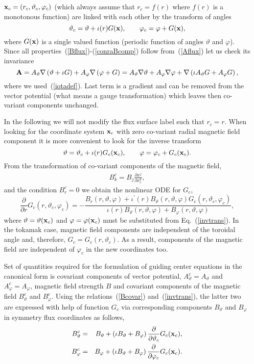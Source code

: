\documentclass[12pt]{article}
\newcommand{\be}[1]{\begin{equation} \label{#1}}
\newcommand{\ee}{\end{equation}}
\newcommand{\bea}[1]{\begin{eqnarray} \label{#1}}
\newcommand{\eea}{\end{eqnarray}}
\newcommand{\eq}[1]{(\ref{#1})}
\newcommand{\difp}[2]{\frac{\partial #1}{\partial #2}}
\newcommand{\bA}{{\bf A}}
\newcommand{\bx}{{\bf x}}
\begin{document}
\begin{itemize}
$\bx_c=(r_c,\vartheta_c,\varphi_c)$ (which always assume 
that $r_c=f(r)$ where $f(r)$ is a monotonous function) 
are linked with each other by the transform of angles
\be{transangles}
\vartheta_c = \vartheta+\iota(r)G(\bx),
\qquad
\varphi_c = \varphi+G(\bx),
\ee
where $G(\bx)$ is a single valued function 
(periodic function of angles $\vartheta$ and $\varphi$).
Since all properties~\eq{Bflux}-\eq{conraBcomp} follow from~\eq{Aflux}
let us check its invariance
\be{Acheck}
\bA=
A_\vartheta\nabla\left(\vartheta+\iota G\right)
+
A_\varphi\nabla\left(\varphi+ G\right)
=
A_\vartheta\nabla\vartheta+A_\varphi\nabla\varphi
+\nabla\left(\iota A_\vartheta G+A_\varphi G\right),
\ee
where we used~\eq{iotadef}. Last term is a gradient and can be removed from
the vector potential (what means a gauge transformation) which leaves then co-variant components unchanged.
\end{itemize}
In the following we will not modify the flux surface label such that $r_c=r$.
When looking for the coordinate system $\bx_c$ with zero co-variant radial magnetic 
field component it is more convenient to look for the inverse
transform
\be{invtrans}
\vartheta = \vartheta_c+\iota(r)G_c(\bx_c),
\qquad
\varphi = \varphi_c+G_c(\bx_c).
\ee
From the transformation of co-variant components of the magnetic field,
\bea{Bcovar}
B_k^c=B_j\difp{x^j}{x_c^k},
\eea
and the condition $B^c_r=0$ we obtain the nonlinear ODE for $G_c$,
\be{eqforG}
\difp{}{r}G_c(r,\vartheta_c,\varphi_c)=
-\frac{B_r(r,\vartheta,\varphi)
+\iota^\prime(r) B_\vartheta(r,\vartheta,\varphi) G_c(r,\vartheta_c,\varphi_c)}
{\iota(r)B_\vartheta(r,\vartheta,\varphi)
+B_\varphi(r,\vartheta,\varphi)},
\ee
where $\vartheta=\vartheta(\bx_c)$ and $\varphi=\varphi(\bx_c)$ must be substituted from Eq.~\eq{invtrans}.
In the tokamak case, magnetic field components are independent of the 
toroidal angle and, therefore, $G_c=G_c(r,\vartheta_c)$. As a result, components
of the magnetic field are independent of $\varphi_c$ in the new coordinates
too.

\noindent
Set of quantities required for the formulation of guiding center equations in the canonical form
is covariant components of vector potential, $A_\vartheta^c=A_\vartheta$ and $A_\varphi^c=A_\varphi$,
magnetic field strength $B$ and covariant components of the magnetic field $B_\vartheta^c$ and $B_\varphi^c$.
Using the relations~\eq{Bcovar} and~\eq{invtrans},
the latter two are expressed with help of function $G_c$ via corresponding components 
$B_\vartheta$ and $B_\varphi$ in symmetry flux coordinates as follows,
\bea{covarBcan}
B_\vartheta^c
&=&
B_\vartheta + \left(\iota B_\vartheta+B_\varphi\right)\difp{}{\vartheta_c}G_c(\bx_c),
\nonumber \\
B_\varphi^c
&=&
B_\varphi + \left(\iota B_\vartheta+B_\varphi\right)\difp{}{\varphi_c}G_c(\bx_c).
\eea
\end{document}
